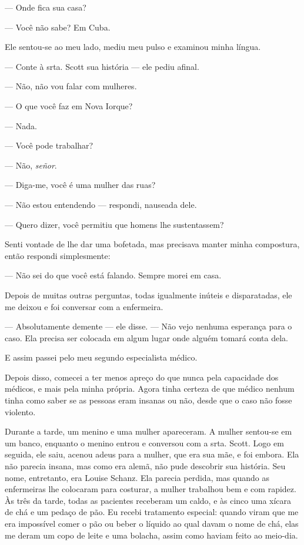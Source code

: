 --- Onde fica sua casa?

--- Você não sabe? Em Cuba.

Ele
sentou-se ao meu lado, mediu meu pulso e examinou minha língua.

--- Conte à srta. Scott sua história --- ele pediu afinal.

--- Não, não vou falar com mulheres.

--- O que você faz em Nova Iorque?

--- Nada.

--- Você pode trabalhar?

--- Não, \emph{señor}.

--- Diga-me, você é uma mulher das ruas?

--- Não estou entendendo --- respondi, nauseada dele.

--- Quero dizer, você permitiu que homens lhe sustentassem?

Senti vontade de lhe dar uma bofetada, mas precisava manter minha
compostura, então respondi simplesmente:

--- Não sei do que você está falando. Sempre morei em casa.

Depois de muitas outras perguntas, todas igualmente inúteis e
disparatadas, ele me deixou e foi conversar com a enfermeira. 

--- Absolutamente demente --- ele disse. --- Não vejo nenhuma esperança para
o caso. Ela precisa ser colocada em algum lugar onde alguém tomará conta
dela.

E assim passei pelo meu segundo especialista médico.

Depois disso, comecei a ter menos apreço do que nunca pela capacidade
dos médicos, e mais pela minha própria. Agora tinha certeza de que
médico nenhum tinha como saber se as pessoas eram insanas ou não, desde
que o caso não fosse violento.

Durante a tarde, um menino e uma mulher apareceram. A mulher sentou-se
em um banco, enquanto o menino entrou e conversou com a srta. Scott.
Logo em seguida, ele saiu, acenou adeus para a mulher, que era sua mãe,
e foi embora. Ela não parecia insana, mas como era alemã, não pude
descobrir sua história. Seu nome, entretanto, era Louise Schanz. Ela
parecia perdida, mas quando as enfermeiras lhe colocaram para costurar,
a mulher trabalhou bem e com rapidez. Às três da tarde, todas as
pacientes receberam um caldo, e às cinco uma xícara de chá e um pedaço
de pão. Eu recebi tratamento especial: quando viram que me era
impossível comer o pão ou beber o líquido ao qual davam o nome de chá,
elas me deram um copo de leite e uma bolacha, assim como haviam feito ao
meio-dia.


